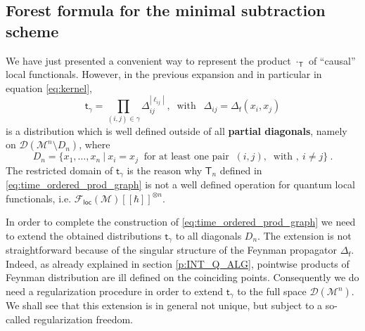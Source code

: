 \documentclass[11pt]{book}
\newcommand{\loc}{\mathsf{loc}}
\newcommand{\abs}[1]{\left|#1\right|}
\newcommand{\Dcal}{\mathcal{D}}
\newcommand{\Fcal}{\mathcal{F}}
\newcommand{\Mcal}{\mathcal{M}}
\newcommand{\Tsf}{\mathsf{T}}
\newcommand{\fsf}{\mathsf{f}}
\newcommand{\tsf}{\mathsf{t}}
\theoremstyle{break}
\begin{document}
\subsection{Forest formula for the minimal subtraction scheme}
\label{p:FOREST FORMULA}


We have just presented a convenient way to represent the product $\cdot_\Tsf$ of ``causal'' local functionals. However, in the previous expansion and in particular in equation \eqref{eq:kernel},
%
\begin{equation*}
\tsf_\gamma = \prod_{(i,j)\in\gamma} \Delta_{ij}^{\abs{\ell_{ij}}} \ , \ \mbox{ with } \ \ \Delta_{ij}=\Delta_\fsf(x_i,x_j)
\end{equation*}
%
is a distribution which is well defined outside of all  \textbf{partial diagonals}, namely on $\Dcal(\Mcal^n\setminus D_n)$, where 
%
\begin{equation}
D_n = \left. \bigg\{x_1, \dots , x_n \ \right| \ x_i = x_j \ \text{ for at least one pair } \  (i,j), \ \mbox{ with } , \ i\neq j \bigg\} \ .
\label{eq:partial_diagonals}
\end{equation}
%
The restricted domain of $\tsf_\gamma$ is the reason why $\Tsf_n$ defined in \eqref{eq:time_ordered_prod_graph} is not a well defined operation for quantum local functionals, i.e. $\Fcal_\loc(\Mcal)[[\hbar]]^{\otimes n}$. 


In order to complete the construction of \eqref{eq:time_ordered_prod_graph} we need to extend the obtained distributions $\tsf_\gamma$ to all diagonals $D_n$. The extension is not  straightforward because of the singular structure of the Feynman propagator $\Delta_\fsf$. Indeed, as already explained in section \ref{p:INT_Q_ALG}, pointwise products of Feynman distribution are ill defined on the coinciding points. Consequently we do need a regularization procedure in order to extend $\tsf_\gamma$ to the full space $\Dcal(\Mcal^n)$. We shall see that this extension is in general not unique, but subject to a so-called regularization freedom.


\bigskip
\end{document}
